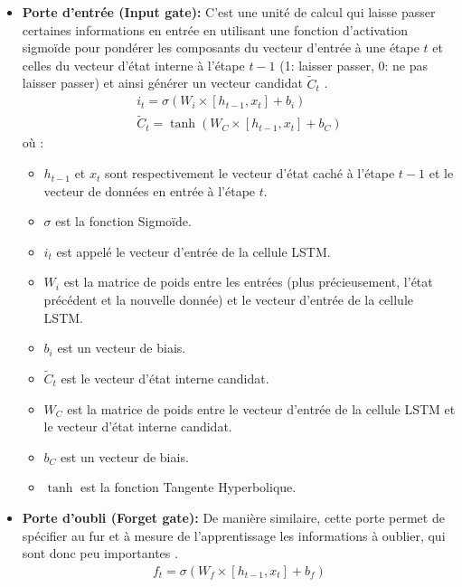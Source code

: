 \begin{itemize}
	\item \textbf{Porte d'entrée (Input gate): } C'est une unité de calcul qui laisse passer certaines informations en entrée en utilisant une fonction d'activation sigmoïde pour pondérer les composants du vecteur d'entrée à une étape $t$ et celles du vecteur d'état interne à l'étape $t-1$ (1: laisser passer, 0: ne pas laisser passer) et ainsi générer un vecteur candidat $\tilde{C}_t$ \citep{lstm_original_paper}.
	\begin{equation}
	\begin{gathered}
	i_t = \sigma(W_i \times [h_{t-1},x_t] + b_i) \\
	\tilde{C}_t = \tanh(W_C \times [h_{t-1},x_t] + b_C)
	\end{gathered}
	\end{equation}
	où : 
	\begin{itemize}
		\item $h_{t-1}$ et $x_t$ sont respectivement le vecteur d'état caché à l'étape $t-1$ et le vecteur de données en entrée à l'étape $t$.
		\item $\sigma$ est la fonction Sigmoïde. 
		\item $i_t$ est appelé le vecteur d'entrée de la cellule LSTM.
		\item $W_i$ est la matrice de poids entre les entrées (plus précieusement, l'état précédent et la nouvelle donnée) et le vecteur d'entrée de la cellule LSTM.
		\item $b_i$ est un vecteur de biais.
		\item $\tilde{C}_t$ est le vecteur d'état interne candidat. 
		\item $W_C$ est la matrice de poids entre le vecteur d'entrée de la cellule LSTM et le vecteur d'état interne candidat.
		\item $b_C$ est un vecteur de biais.
		\item $\tanh$ est la fonction Tangente Hyperbolique. 		
	\end{itemize}
	\item \textbf{Porte d'oubli (Forget gate): } De manière similaire, cette porte permet de spécifier au fur et à mesure de l'apprentissage les informations à oublier, qui sont donc peu importantes \citep{lstm_original_paper,rnn_lstms}.
	\begin{equation}
	\begin{gathered}
	f_t = \sigma(W_f \times [h_{t-1},x_t] + b_f)
	\end{gathered}
	\end{equation}
	

\end{itemize}
